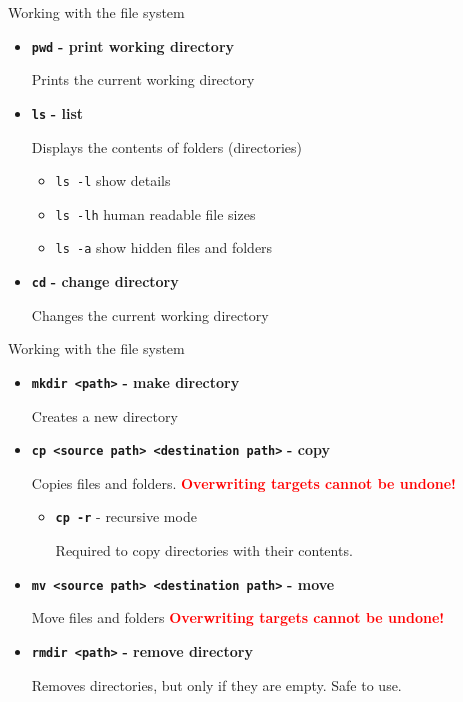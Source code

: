 \documentclass[aspectratio=1610]{beamer}
\newcommand\curtitle{}
\newcommand\command[1]{\alert{\textbf{\texttt{#1}}}}
\begin{document}
\renewcommand\curtitle{Working with the file system}


\begin{frame}[c]{\curtitle}
    \begin{itemize}[<+->]
        \setlength\itemsep{1em}
        \item \command{pwd} \textbf{- print working directory} 

            Prints the current working directory
        \item \command{ls} \textbf{- list} 

            Displays the contents of folders (directories)
            \begin{itemize}[<.->]
                \item \alert{\texttt{ls -l}} show details
                \item \alert{\texttt{ls -lh}} human readable file sizes
                \item \alert{\texttt{ls -a}} show hidden files and folders
            \end{itemize}
        \item \command{cd} \textbf{- change directory} 

            Changes the current working directory
    \end{itemize}
\end{frame}



\begin{frame}[c]{\curtitle}
    \begin{itemize}[<+->]
        \setlength\itemsep{1em}
        \item \command{mkdir <path>} \textbf{- make directory} 

            Creates a new directory
        \item \command{cp <source path> <destination path>} \textbf{- copy} 

            Copies files and folders. \textcolor{red}{\textbf{Overwriting targets cannot be
            undone!}}
            \begin{itemize}[<.->]
                \item \command{cp -r} - recursive mode

                    Required to copy directories with their contents.
            \end{itemize}
        \item \command{mv <source path> <destination path>} \textbf{- move} 

            Move files and folders \textcolor{red}{\textbf{Overwriting targets cannot be undone!}}
        \item \command{rmdir <path>} \textbf{- remove directory} 

            Removes directories, but only if they are empty. Safe to use.
    \end{itemize}
\end{frame}
\end{document}
